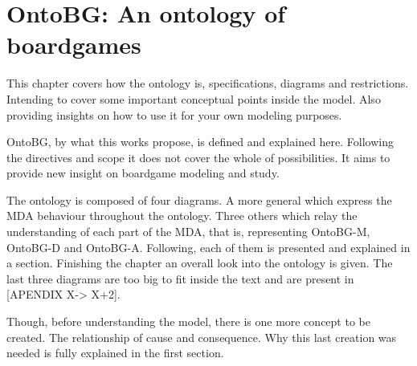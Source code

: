 \chapter{OntoBG: An ontology of boardgames}

This chapter covers how the ontology is, specifications, diagrams and restrictions. Intending to cover some important conceptual points inside the model. Also providing insights on how to use it for your own modeling purposes.

OntoBG, by what this works propose, is defined and explained here. Following the directives and scope it does not cover the whole of possibilities. It aims to provide new insight on boardgame modeling and study. 

The ontology is composed of four diagrams. A more general which express the MDA behaviour throughout the ontology. Three others which relay the understanding of each part of the MDA, that is, representing OntoBG-M, OntoBG-D and OntoBG-A. Following, each of them is presented and explained in a section. Finishing the chapter an overall look into the ontology is given. The last three diagrams are too big to fit inside the text and are present in [APENDIX X-> X+2].

Though, before understanding the model, there is one more concept to be created. The relationship of cause and consequence. Why this last creation was needed is fully explained in the first section.







